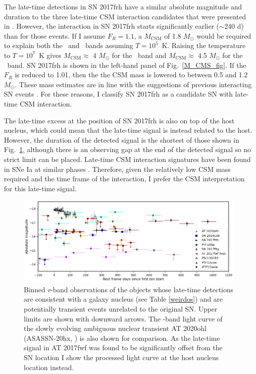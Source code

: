 \documentclass[a4paper,oneside,12pt, class=Latex/Classes/PhDthesisPSnPDF, crop=false]{standalone}
\begin{document}
The late-time detections in SN 2017frh have a similar absolute magnitude and duration to the three late-time CSM interaction candidates that were presented in \citet{Terwel_2024_paper1}. However, the interaction in SN 2017frh starts significantly earlier ($\sim$240 d) than for those events. If I assume $F_R = 1.1$, a $M_\text{CSM}$ of 1.8 $M_\odot$ would be required to explain both the \ztfg\ and \ztfr\ bands assuming $T=10^5$~K. Raising the temperature to $T=10^7$~K gives $M_\text{CSM}\approx$ 4 $M_\odot$ for the \ztfg\ band and $M_\text{CSM}\approx$ 4.5 $M_\odot$ for the \ztfr\ band. SN 2017frh is shown in the left-hand panel of Fig.~\ref{M_CMS_fig}. If the $F_R$ is reduced to 1.01, then the the CSM mass is lowered to between 0.5 and 1.2 $M_\odot$. These mass estimates are in line with the suggestions of previous interacting SN events \citep{PTF11kx, Inserra_2016}. For these reasons, I classify SN 2017frh as a candidate SN with late-time CSM interaction.

The late-time excess at the position of SN 2017frh is also on top of the host nucleus, which could mean that the late-time signal is instead related to the host. However, the duration of the detected signal is the shortest of those shown in Fig.~\ref{ANT_comp}, although there is an observing gap at the end of the detected signal so no strict limit can be placed. Late-time CSM interaction signatures have been found in SNe Ia at similar phases \citep{2015cp}. Therefore, given the relatively low CSM mass required and the time frame of the interaction, I prefer the CSM interpretation for this late-time signal.\\

\begin{figure}
    \centering
    \includegraphics[width=\textwidth]{../Images/chapter_4/ANT_comp.png}
    \caption{Binned \textit{r}-band observations of the objects whose late-time detections are consistent with a galaxy nucleus (see Table \ref{weirdos}) and are potentially transient events unrelated to the original SN. Upper limits are shown with downward arrows. The \ztfr-band light curve of the slowly evolving ambiguous nuclear transient AT 2020ohl (ASASSN-20hx, \citealt{2020ohl_Hinkle}) is also shown for comparison. As the late-time signal in AT 2017fwf was found to be significantly offset from the SN location I show the processed light curve at the host nucleus location instead.}
    \label{ANT_comp}
\end{figure}
\end{document}
